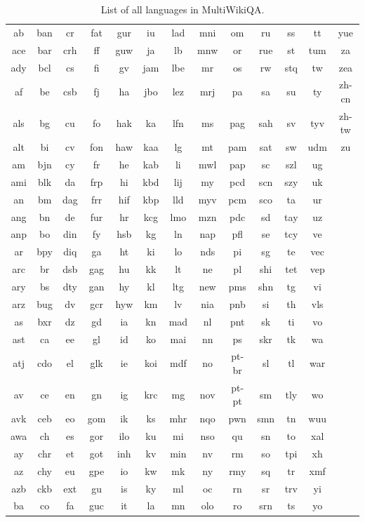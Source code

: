 \documentclass[10pt, a4paper]{article}
\begin{document}
\begin{table}[h]
    \centering
    \scriptsize
    \begin{tabular}{ccccccccccccc}
        ab & ban & cr & fat & gur & iu & lad & mni & om & ru & ss & tt & yue \\
        ace & bar & crh & ff & guw & ja & lb & mnw & or & rue & st & tum & za \\
        ady & bcl & cs & fi & gv & jam & lbe & mr & os & rw & stq & tw & zea \\
        af & be & csb & fj & ha & jbo & lez & mrj & pa & sa & su & ty & zh-cn \\
        als & bg & cu & fo & hak & ka & lfn & ms & pag & sah & sv & tyv & zh-tw \\
        alt & bi & cv & fon & haw & kaa & lg & mt & pam & sat & sw & udm & zu \\
        am & bjn & cy & fr & he & kab & li & mwl & pap & sc & szl & ug & \\
        ami & blk & da & frp & hi & kbd & lij & my & pcd & scn & szy & uk & \\
        an & bm & dag & frr & hif & kbp & lld & myv & pcm & sco & ta & ur & \\
        ang & bn & de & fur & hr & kcg & lmo & mzn & pdc & sd & tay & uz & \\
        anp & bo & din & fy & hsb & kg & ln & nap & pfl & se & tcy & ve & \\
        ar & bpy & diq & ga & ht & ki & lo & nds & pi & sg & te & vec & \\
        arc & br & dsb & gag & hu & kk & lt & ne & pl & shi & tet & vep & \\
        ary & bs & dty & gan & hy & kl & ltg & new & pms & shn & tg & vi & \\
        arz & bug & dv & gcr & hyw & km & lv & nia & pnb & si & th & vls & \\
        as & bxr & dz & gd & ia & kn & mad & nl & pnt & sk & ti & vo & \\
        ast & ca & ee & gl & id & ko & mai & nn & ps & skr & tk & wa & \\
        atj & cdo & el & glk & ie & koi & mdf & no & pt-br & sl & tl & war & \\
        av & ce & en & gn & ig & krc & mg & nov & pt-pt & sm & tly & wo & \\
        avk & ceb & eo & gom & ik & ks & mhr & nqo & pwn & smn & tn & wuu & \\
        awa & ch & es & gor & ilo & ku & mi & nso & qu & sn & to & xal & \\
        ay & chr & et & got & inh & kv & min & nv & rm & so & tpi & xh & \\
        az & chy & eu & gpe & io & kw & mk & ny & rmy & sq & tr & xmf & \\
        azb & ckb & ext & gu & is & ky & ml & oc & rn & sr & trv & yi & \\
        ba & co & fa & guc & it & la & mn & olo & ro & srn & ts & yo & \\
    \end{tabular}
    \caption{List of all languages in MultiWikiQA.}
    \label{tab:language-overview}
\end{table}
\end{document}
